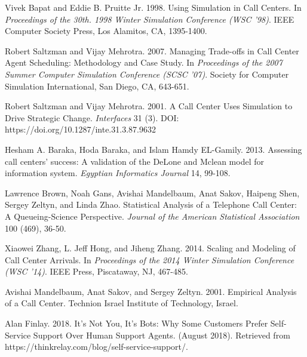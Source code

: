\documentclass[12pt,twocolumn]{article}
\begin{document}
\newpage
\clearpage
{}
\begin{thebibliography}{8}
	
Vivek Bapat and Eddie B. Pruitte Jr. 1998. Using Simulation in Call Centers. In \textit{Proceedings of the 30th.  1998 Winter Simulation Conference (WSC ’98)}. IEEE Computer Society Press, Los Alamitos, CA, 1395-1400.

Robert Saltzman and Vijay Mehrotra. 2007. Managing Trade-offs in Call Center Agent Scheduling: Methodology and Case Study. In \textit{Proceedings of the 2007 Summer Computer Simulation Conference (SCSC ’07)}. Society for Computer Simulation International, San Diego, CA, 643-651.

Robert Saltzman and Vijay Mehrotra. 2001. A Call Center Uses Simulation to Drive Strategic Change. \textit{Interfaces} 31 (3). DOI: https://doi.org/10.1287/inte.31.3.87.9632

Hesham A. Baraka, Hoda Baraka, and Islam Hamdy EL-Gamily. 2013. Assessing call centers’ success: A validation of the DeLone and Mclean model for information system. \textit{Egyptian Informatics Journal} 14, 99-108.

Lawrence Brown, Noah Gans, Avishai Mandelbaum, Anat Sakov, Haipeng Shen, Sergey Zeltyn, and Linda Zhao. Statistical Analysis of a Telephone Call Center: A Queueing-Science Perspective. \textit{Journal of the American Statistical Association} 100 (469), 36-50.

Xiaowei Zhang, L. Jeff Hong, and Jiheng Zhang. 2014. Scaling and Modeling of Call Center Arrivals. In \textit{Proceedings of the 2014 Winter Simulation Conference (WSC ’14)}. IEEE Press, Piscataway, NJ, 467-485. 

Avishai Mandelbaum, Anat Sakov, and Sergey Zeltyn. 2001. Empirical Analysis of a Call Center. Technion Israel Institute of Technology, Israel. 

Alan Finlay. 2018. It’s Not You, It’s Bots: Why Some Customers Prefer Self-Service Support Over Human Support Agents. (August 2018). Retrieved from https://thinkrelay.com/blog/self-service-support/.

\end{thebibliography}
\end{document}
